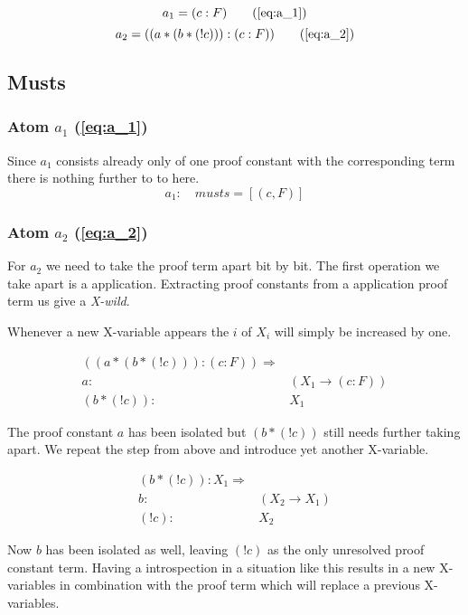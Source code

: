 \begin{equation*}
		a_1 = (c:F) 
		\tag{\ref{eq:a_1}}
\end{equation*}
\begin{equation*}		
		a_2 = ((a *(b* (! c))):(c:F)) 
		\tag{\ref{eq:a_2}}
\end{equation*}

\subsection{Musts}
\subsubsection[First atom]{Atom $a_1$ (\ref{eq:a_1})}
Since $a_1$ consists already only of one proof constant with the corresponding term there is nothing further to to here.
\begin{equation}
	a_1: \quad musts = [(c, F)]
\end{equation}

\subsubsection[Second atom]{Atom $a_2$ (\ref{eq:a_2})}
For $a_2$ we need to take the proof term apart bit by bit. The first operation we take apart is a application. Extracting proof constants from a application proof term us give a \emph{X-wild}. 

Whenever a new X-variable appears the $i$ of $X_i$ will simply be increased by one.

\begin{align*}\label{eq:musts1_a_2}
		((a *(b* (! c))):(c:F)) \Rightarrow & \\
		 a : &(X_1 \rightarrow (c:F)) \\
		 (b*(! c)): &X_1
\end{align*}

The proof constant $a$ has been isolated but $(b*(! c))$ still needs further taking apart. We repeat the step from above and introduce yet another X-variable.

\begin{align*}
	(b*(! c)): X_1 \Rightarrow & \\
	b : & (X_2 \rightarrow X_1) \\
	(! c) : & X_2
\end{align*}

Now $b$ has been isolated as well, leaving $(! c)$ as the only unresolved proof constant term. Having a introspection in a situation like this results in a new X-variables in combination with the proof term which will replace a previous X-variables.

